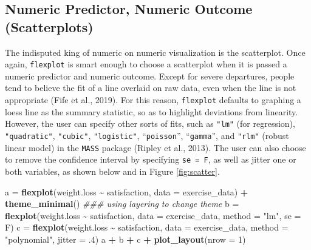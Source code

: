 \documentclass[
  english,
  man]{apa6}
\newenvironment{Shaded}{\begin{snugshade}}{\end{snugshade}}
\newcommand{\CommentTok}[1]{\textcolor[rgb]{0.56,0.35,0.01}{\textit{#1}}}
\newcommand{\DataTypeTok}[1]{\textcolor[rgb]{0.13,0.29,0.53}{#1}}
\newcommand{\DecValTok}[1]{\textcolor[rgb]{0.00,0.00,0.81}{#1}}
\newcommand{\FloatTok}[1]{\textcolor[rgb]{0.00,0.00,0.81}{#1}}
\newcommand{\KeywordTok}[1]{\textcolor[rgb]{0.13,0.29,0.53}{\textbf{#1}}}
\newcommand{\NormalTok}[1]{#1}
\newcommand{\OperatorTok}[1]{\textcolor[rgb]{0.81,0.36,0.00}{\textbf{#1}}}
\newcommand{\StringTok}[1]{\textcolor[rgb]{0.31,0.60,0.02}{#1}}
\begin{document}
\normalsize

\hypertarget{numeric-predictor-numeric-outcome-scatterplots}{%
\subsection{Numeric Predictor, Numeric Outcome (Scatterplots)}\label{numeric-predictor-numeric-outcome-scatterplots}}

The indisputed king of numeric on numeric visualization is the scatterplot. Once again, \texttt{flexplot} is smart enough to choose a scatterplot when it is passed a numeric predictor and numeric outcome. Except for severe departures, people tend to believe the fit of a line overlaid on raw data, even when the line is not appropriate (Fife et al., 2019). For this reason, \texttt{flexplot} defaults to graphing a loess line as the summary statistic, so as to highlight deviations from linearity. However, the user can specify other sorts of fits, such as \texttt{"lm"} (for regression), \texttt{"quadratic"}, \texttt{"cubic"}, \texttt{"logistic"}, ``\texttt{poisson}'', ``\texttt{gamma}'', and \texttt{"rlm"} (robust linear model) in the \texttt{MASS} package (Ripley et al., 2013). The user can also choose to remove the confidence interval by specifying \texttt{se\ =\ F}, as well as jitter one or both variables, as shown below and in Figure \ref{fig:scatter}.

\small

\begin{Shaded}
\begin{Highlighting}[]
\NormalTok{a =}\StringTok{ }\KeywordTok{flexplot}\NormalTok{(weight.loss }\OperatorTok{\textasciitilde{}}\StringTok{ }\NormalTok{satisfaction, }\DataTypeTok{data =}\NormalTok{ exercise\_data) }\OperatorTok{+}\StringTok{ }
\StringTok{  }\KeywordTok{theme\_minimal}\NormalTok{() }\CommentTok{\#\#\# using layering to change theme}
\NormalTok{b =}\StringTok{ }\KeywordTok{flexplot}\NormalTok{(weight.loss }\OperatorTok{\textasciitilde{}}\StringTok{ }\NormalTok{satisfaction, }\DataTypeTok{data =}\NormalTok{ exercise\_data, }
             \DataTypeTok{method =} \StringTok{"lm"}\NormalTok{, }\DataTypeTok{se =}\NormalTok{ F)}
\NormalTok{c =}\StringTok{ }\KeywordTok{flexplot}\NormalTok{(weight.loss }\OperatorTok{\textasciitilde{}}\StringTok{ }\NormalTok{satisfaction, }\DataTypeTok{data =}\NormalTok{ exercise\_data, }
             \DataTypeTok{method =} \StringTok{"polynomial"}\NormalTok{, }\DataTypeTok{jitter =} \FloatTok{.4}\NormalTok{)}
\NormalTok{a }\OperatorTok{+}\StringTok{ }\NormalTok{b }\OperatorTok{+}\StringTok{ }\NormalTok{c }\OperatorTok{+}\StringTok{ }\KeywordTok{plot\_layout}\NormalTok{(}\DataTypeTok{nrow =} \DecValTok{1}\NormalTok{)}
\end{Highlighting}
\end{Shaded}
\end{document}
